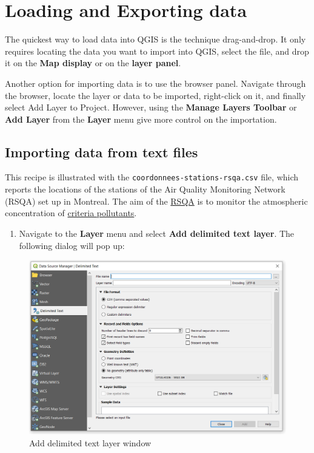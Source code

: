 \documentclass[]{book}
\providecommand{\tightlist}{%
  \setlength{\itemsep}{0pt}\setlength{\parskip}{0pt}}
\theoremstyle{definition}
\theoremstyle{definition}
\theoremstyle{definition}
\theoremstyle{remark}
\begin{document}
\chapter{Loading and Exporting data}\label{loading-and-exporting-data}

The quickest way to load data into QGIS is the technique drag-and-drop.
It only requires locating the data you want to import into QGIS, select
the file, and drop it on the \textbf{Map display} or on the
\textbf{layer panel}.

Another option for importing data is to use the browser panel. Navigate
through the browser, locate the layer or data to be imported,
right-click on it, and finally select Add Layer to Project. However,
using the \textbf{Manage Layers Toolbar} or \textbf{Add Layer} from the
\textbf{Layer} menu give more control on the importation.

\section{Importing data from text
files}\label{importing-data-from-text-files}

This recipe is illustrated with the
\texttt{coordonnees-stations-rsqa.csv} file, which reports the locations
of the stations of the Air Quality Monitoring Network (RSQA) set up in
Montreal. The aim of the
\href{https://ville.montreal.qc.ca/rapportmontrealdurable/en/air-quality.php}{RSQA}
is to monitor the atmospheric concentration of
\href{https://www.epa.gov/criteria-air-pollutants}{criteria pollutants}.

\begin{enumerate}
\def\labelenumi{\arabic{enumi}.}
\tightlist
\item
  Navigate to the \textbf{Layer} menu and select \textbf{Add delimited
  text layer}. The following dialog will pop up:
\end{enumerate}

\begin{figure}

{\centering \includegraphics[width=15.21in]{figures/Delimited_Text_Dialog} 

}

\caption{Add delimited text layer window}\label{fig:unnamed-chunk-2}
\end{figure}
\end{document}
